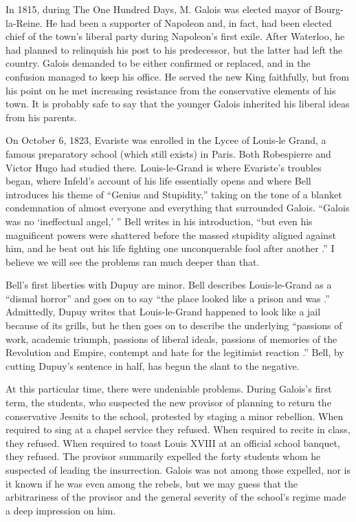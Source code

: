 \documentclass[12pt]{article}
\begin{document}
In 1815, during The One Hundred Days, M. Galois was elected mayor of Bourg-la-Reine. He had been a supporter of Napoleon and, in fact, had been elected chief of the town's liberal party during Napoleon's first exile. After Waterloo, he had planned to relinquish his post to his predecessor, but the latter had left the country. Galois demanded to be either confirmed or replaced, and in the confusion managed to keep his office. He served the new King faithfully, but from his point on he met increasing resistance from the conservative elements of his town. It is probably safe to say that the younger Galois inherited his liberal ideas from his parents.

On October 6, 1823, Evariste was enrolled in the Lycee of Louis-le Grand, a famous preparatory school (which still exists) in Paris. Both Robespierre and Victor Hugo had studied there. Louis-le-Grand is where Evariste's troubles began, where Infeld's account of his life essentially opens and where Bell introduces his theme of ``Genius and Stupidity,'' taking on the tone of a blanket condemnation of almost everyone and everything that surrounded Galois. ``Galois was no `ineffectual angel,' '' Bell writes in his introduction, ``but even his magnificent powers were shattered before the massed stupidity aligned against him, and he beat out his life fighting one unconquerable fool after another \cite{14}.'' I believe we will see the problems ran much deeper than that.

Bell's first liberties with Dupuy are minor. Bell describes Louis-le-Grand as a ``dismal horror'' and goes on to say ``the place looked like a prison and was \cite{15}.'' Admittedly, Dupuy writes that Louis-le-Grand happened to look like a jail because of its grills, but he then goes on to describe the underlying ``passions of work, academic triumph, passions of liberal ideals, passions of memories of the Revolution and Empire, contempt and hate for the legitimist reaction \cite{16}.'' Bell, by cutting Dupuy's sentence in half, has begun the slant to the negative.

At this particular time, there were undeniable problems. During Galois's first term, the students, who suspected the new provisor of planning to return the conservative Jesuits to the school, protested by staging a minor rebellion. When required to sing at a chapel service they refused. When required to recite in class, they refused. When required to toast Louis XVIII at an official school banquet, they refused. The provisor summarily expelled the forty students whom he suspected of leading the insurrection. Galois was not among those expelled, nor is it known if he was even among the rebels, but we may guess that the arbitrariness of the provisor and the general severity of the school's regime made a deep impression on him.
\end{document}
